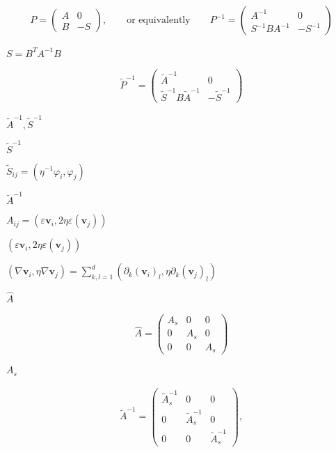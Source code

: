 \documentclass{article}
\begin{document}
\begin{eqnarray*} P = \left(\begin{array}{cc} A & 0 \\ B & -S \end{array}\right), \qquad \text{or equivalently} \qquad P^{-1} = \left(\begin{array}{cc} A^{-1} & 0 \\ S^{-1} B A^{-1} & -S^{-1} \end{array}\right) \end{eqnarray*}
\pagebreak

$S=B^TA^{-1}B$
\pagebreak

\begin{eqnarray*} \tilde P^{-1} = \left(\begin{array}{cc} \tilde A^{-1} & 0 \\ \tilde S^{-1} B \tilde A^{-1} & -\tilde S^{-1} \end{array}\right) \end{eqnarray*}
\pagebreak

$\tilde A^{-1},\tilde S^{-1}$
\pagebreak

$\tilde S^{-1}$
\pagebreak

$\tilde S_{ij}=(\eta^{-1}\varphi_i,\varphi_j)$
\pagebreak

$\tilde A^{-1}$
\pagebreak

$A_{ij} = (\varepsilon {\mathbf v}_i, 2\eta \varepsilon ({\mathbf v}_j))$
\pagebreak

$(\varepsilon {\mathbf v}_i, 2 \eta \varepsilon ({\mathbf v}_j))$
\pagebreak

$(\nabla {\mathbf v}_i, \eta \nabla {\mathbf v}_j) = \sum_{k,l=1}^d (\partial_k ({\mathbf v}_i)_l, \eta \partial_k ({\mathbf v}_j)_l) $
\pagebreak

$\hat A$
\pagebreak

\begin{eqnarray*} \hat A = \left(\begin{array}{ccc} A_s & 0 & 0 \\ 0 & A_s & 0 \\ 0 & 0 & A_s \end{array}\right) \end{eqnarray*}
\pagebreak

$A_s$
\pagebreak

\begin{eqnarray*} \tilde A^{-1} = \left(\begin{array}{ccc} \tilde A_s^{-1} & 0 & 0 \\ 0 & \tilde A_s^{-1} & 0 \\ 0 & 0 & \tilde A_s^{-1} \end{array}\right), \end{eqnarray*}
\pagebreak
\end{document}
